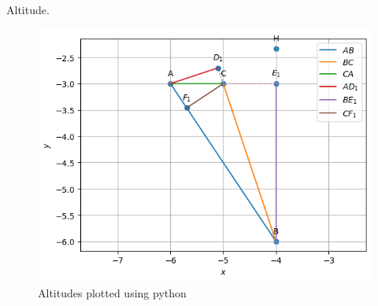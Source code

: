 \begin{table}[H]
        \caption{Altitude.}
        \centering
        
    \end{table}
\begin{figure}[H]
\includegraphics[width=\columnwidth]{1.3/figs/1.3.png}
\caption{Altitudes plotted using python}
\label{fig:i_1.3_py}
\end{figure}
